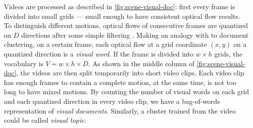 Videos are processed as described in \ref{fig:scene-visual-doc}: first every frame is divided into small grids --- small enough to have consistent optical flow results. 
To distinguish different motions, optical flows of consecutive frames are quantized on $D$ directions after some simple filtering \cite{kalal2010forward}. 
Making an analogy with to document clustering, on a certain frame, each optical flow at a grid coordinate $(x, y)$ on a quantized direction is a \emph{visual word}.
If the frame is divided into $w\times h$ grids, the vocabulary is $V = w\times h\times D$.
As shown in the middle column of \ref{fig:scene-visual-doc}, the videos are then split temporarily into short video clips. 
Each video clip has enough frames to contain a complete motion, at the same time, is not too long to have mixed motions. 
By counting the number of visual words on each grid and each quantized direction in every video clip, we have a bag-of-words representation of \emph{visual documents}. 
Similarly, a cluster trained from the video could be called \emph{visual topic}.



